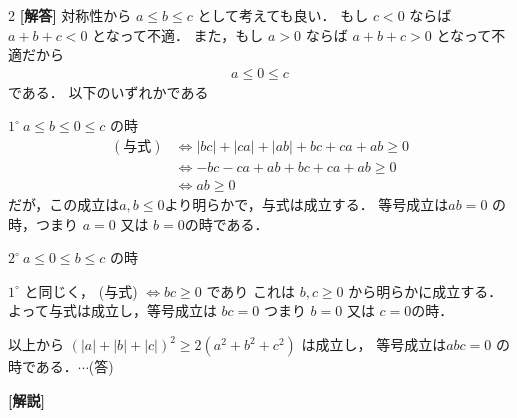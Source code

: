 \documentclass[../../main.tex]{subfiles}
\begin{document}
\setcounter{equation}{0}
\begin{oframed}
  
\end{oframed}
\setlength{\columnseprule}{0.4pt}
\begin{multicols}{2}
  {\bf [解答]}
  対称性から $a \le b \le c$ として考えても良い．
  もし $c < 0$ ならば $a+b+c < 0$ となって不適．
  また，もし $a > 0$ ならば $a+b+c > 0$ となって不適だから
  \begin{align}
    a \le 0 \le c
  \end{align}
  である．
  以下のいずれかである


  $1^\circ \ a \le b \le 0 \le c$ の時
  \begin{align}
    (\text{与式})
    & \iff |bc| + |ca| + |ab| + bc + ca + ab \ge 0 \\
    & \iff -bc - ca + ab + bc + ca + ab \ge 0      \\
    & \iff ab \ge 0
  \end{align}
  だが，この成立は$a,b \le 0$より明らかで，与式は成立する．
  等号成立は$ab=0$ の時，つまり $a=0$ 又は $b=0$の時である．


  $2^\circ \ a \le 0 \le b \le c$ の時

  $1^\circ$ と同じく， (与式) $\iff bc \ge 0$ であり
  これは $b, c \ge 0$ から明らかに成立する．
  よって与式は成立し，等号成立は $bc=0$ つまり $b=0$ 又は $c=0$の時．


  以上から $(|a|+|b|+|c|)^2 \ge 2(a^2+b^2+c^2)$ は成立し，
  等号成立は$abc=0$ の時である．$\cdots$(答)

  {\bf [解説]}

  \newpage
\end{multicols}
\end{document}
